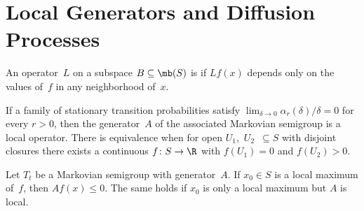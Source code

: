 \section	{Local Generators and Diffusion Processes}

\begin	{definition}
An operator~$L$ on a subspace \( B \subseteq \mb(S) \) is 
if $Lf(x)$ depends only on the values of~$f$ in any neighborhood of~$x$.
\end	{definition}

\begin	{proposition}
If a family of stationary transition probabilities
satisfy \( \lim_{\delta\to0} \alpha_r(\delta)/\delta = 0 \)
for every \( r > 0 \),
then the generator~$A$ of the associated Markovian semigroup
is a local operator.
There is equivalence when for open $U_1$,~$U_2$~$\subseteq S$
with disjoint closures
there exists a continuous \( f \colon S \to \R \)
with \( f(U_1) = 0 \) and \( f(U_2) > 0 \).
\end	{proposition}

\begin	{proposition}
Let $T_t$ be a Markovian semigroup with generator~$A$.
If \( x_0 \in S \) is a local maximum of~$f$,
then \( Af(x) \le 0 \).
The same holds if $x_0$ is only a local maximum but $A$ is local.
\end	{proposition}
